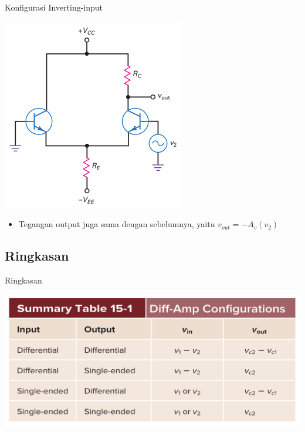 \documentclass[aspectratio=169]{beamer}
\begin{document}
\begin{frame}{Konfigurasi Inverting-input}
	\begin{multicols}{2}
		\begin{center}
			\includegraphics[height=0.7\textheight]{gambar/01.inverting_input+single-ended_output}
		\end{center}
		\columnbreak
		\begin{itemize}
			\item Tegangan output juga sama dengan sebelumnya, yaitu $ v_{out} = -A_v(v_2) $
		\end{itemize}
	\end{multicols}
\end{frame}

\subsection{Ringkasan}
\begin{frame}{Ringkasan}
	\begin{center}
		\includegraphics[height=0.6\textheight]{gambar/01.ringkasan_dif-amp-conf}
	\end{center}
\end{frame}
\end{document}
